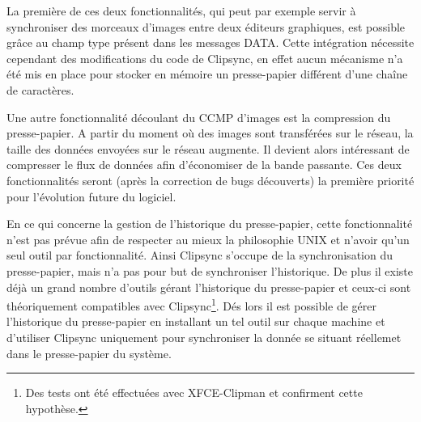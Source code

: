 La première de ces deux fonctionnalités, qui peut par exemple servir à
synchroniser des morceaux d'images entre deux éditeurs graphiques, est
possible grâce au champ type présent dans les messages DATA. Cette intégration
nécessite cependant des modifications du code de Clipsync, en effet aucun
mécanisme n'a été mis en place pour stocker en mémoire un presse-papier
différent d'une chaîne de caractères.

Une autre fonctionnalité découlant du CCMP d'images est la compression du
presse-papier. A partir du moment où des images sont transférées sur le
réseau, la taille des données envoyées sur le réseau augmente. Il devient
alors intéressant de compresser le flux de données afin d'économiser de la
bande passante. Ces deux fonctionnalités seront (après la correction
de bugs découverts) la première priorité pour l'évolution future du logiciel.

En ce qui concerne la gestion de l'historique du presse-papier, cette
fonctionnalité n'est pas prévue afin de respecter au mieux la philosophie
UNIX et n'avoir qu'un seul outil par fonctionnalité. Ainsi Clipsync
s'occupe de la synchronisation du presse-papier, mais n'a pas pour but de
synchroniser l'historique. De plus il existe déjà un grand nombre d'outils
gérant l'historique du presse-papier et ceux-ci sont théoriquement compatibles
avec Clipsync\footnote{Des tests ont été effectuées avec XFCE-Clipman et
confirment cette hypothèse.}. Dés lors il est possible de gérer l'historique
du presse-papier en installant un tel outil sur chaque machine et d'utiliser
Clipsync uniquement pour synchroniser la donnée se situant réellemet dans
le presse-papier du système.